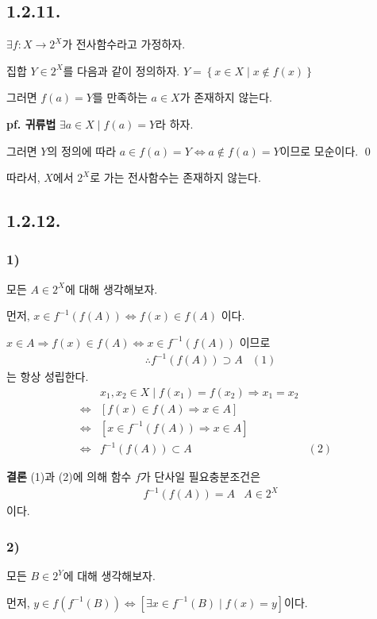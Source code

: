 \documentclass{article}
\begin{document}
\subsection{1.2.11.}
$\exists f : X \rightarrow 2^X$가 전사함수라고 가정하자.

집합 $Y \in 2^X$를 다음과 같이 정의하자. $Y = \left\{ x \in X \mid x \notin f(x) \right\}$

그러면 $f(a) = Y$를 만족하는 $a \in X$가 존재하지 않는다.

\textbf{pf. 귀류법} $\exists a \in X \mid f(a) = Y$라 하자.

그러면 $Y$의 정의에 따라 $a \in f(a)=Y \iff a \notin f(a)=Y$이므로 모순이다. \qed

따라서, $X$에서 $2^X$로 가는 전사함수는 존재하지 않는다.

\subsection{1.2.12.}
\subsubsection{1)}
모든 $A \in 2^X$에 대해 생각해보자.

먼저, $x \in f^{-1}(f(A)) \iff f(x) \in f(A)$ 이다. 

$x \in A \Rightarrow f(x) \in f(A) \iff x \in f^{-1}(f(A))$ 이므로
\begin{align*}
&\therefore f^{-1}(f(A)) \supset A & (1)
\end{align*}
는 항상 성립한다.
\begin{align*}
& x_1, x_2 \in X \mid f(x_1) = f(x_2) \Rightarrow x_1 = x_2
\\ \iff& \left[f(x) \in f(A) \Rightarrow x \in A \right]
\\ \iff& \left[x \in f^{-1}(f(A)) \Rightarrow x \in A \right]
\\ \iff& f^{-1}(f(A)) \subset A & (2)
\end{align*}


\textbf{결론} (1)과 (2)에 의해 함수 $f$가 단사일 필요충분조건은 
\begin{align*}
&f^{-1}(f(A)) = A &A \in 2^X
\end{align*}이다.

\subsubsection{2)}
모든 $B \in 2^Y$에 대해 생각해보자.

먼저, $y \in f(f^{-1}(B)) \iff [\exists x \in f^{-1}(B) \mid f(x) = y] $이다.
\end{document}
